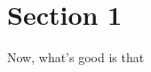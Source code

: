 \documentclass{article}
\begin{document}
\section{Section 1}

Now, what's good is that
\end{document}
